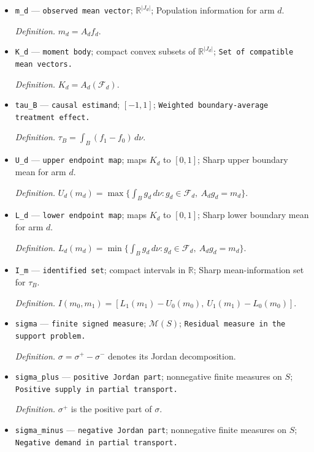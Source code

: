 \documentclass{article}
\begin{document}
\begin{itemize}
  \item \texttt{m\_\allowbreak{}d} --- \texttt{observed mean vector}; \(\mathbb R^{|J_d|}\); Population information for arm \(d\).
  \par\smallskip\noindent\emph{Definition.} \(m_d=A_df_d\).
  \item \texttt{K\_\allowbreak{}d} --- \texttt{moment body}; compact convex subsets of \(\mathbb R^{|J_d|}\); \texttt{Set of compatible mean vectors.}
  \par\smallskip\noindent\emph{Definition.} \(K_d=A_d(\mathcal F_d)\).
  \item \texttt{tau\_\allowbreak{}B} --- \texttt{causal estimand}; \([-1,1]\); \texttt{Weighted boundary-\allowbreak{}average treatment effect.}
  \par\smallskip\noindent\emph{Definition.} \(\tau_B=\int_B(f_1-f_0)\,d\nu\).
  \item \texttt{U\_\allowbreak{}d} --- \texttt{upper endpoint map}; maps \(K_d\) to \([0,1]\); Sharp upper boundary mean for arm \(d\).
  \par\smallskip\noindent\emph{Definition.} \(U_d(m_d)=\max\{\int_B g_d\,d\nu:g_d\in\mathcal F_d,\ A_dg_d=m_d\}\).
  \item \texttt{L\_\allowbreak{}d} --- \texttt{lower endpoint map}; maps \(K_d\) to \([0,1]\); Sharp lower boundary mean for arm \(d\).
  \par\smallskip\noindent\emph{Definition.} \(L_d(m_d)=\min\{\int_B g_d\,d\nu:g_d\in\mathcal F_d,\ A_dg_d=m_d\}\).
  \item \texttt{I\_\allowbreak{}m} --- \texttt{identified set}; compact intervals in \(\mathbb R\); Sharp mean-information set for \(\tau_B\).
  \par\smallskip\noindent\emph{Definition.} \(I(m_0,m_1)=[L_1(m_1)-U_0(m_0),\ U_1(m_1)-L_0(m_0)]\).
  \item \texttt{sigma} --- \texttt{finite signed measure}; \(\mathcal M(S)\); \texttt{Residual measure in the support problem.}
  \par\smallskip\noindent\emph{Definition.} \(\sigma=\sigma^+-\sigma^-\) denotes its Jordan decomposition.
  \item \texttt{sigma\_\allowbreak{}plus} --- \texttt{positive Jordan part}; nonnegative finite measures on \(S\); \texttt{Positive supply in partial transport.}
  \par\smallskip\noindent\emph{Definition.} \(\sigma^+\) is the positive part of \(\sigma\).
  \item \texttt{sigma\_\allowbreak{}minus} --- \texttt{negative Jordan part}; nonnegative finite measures on \(S\); \texttt{Negative demand in partial transport.}

\end{itemize}
\end{document}
